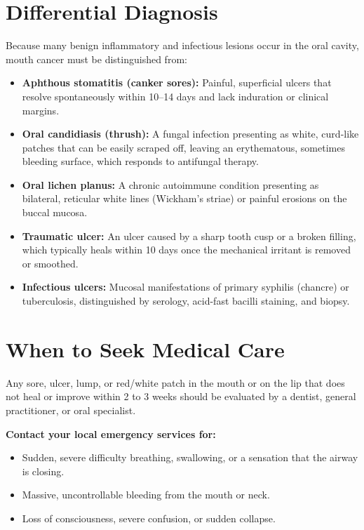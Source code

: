 \section*{Differential Diagnosis}
Because many benign inflammatory and infectious lesions occur in the oral cavity, mouth cancer must be distinguished from:
\begin{itemize}
    \item \textbf{Aphthous stomatitis (canker sores):} Painful, superficial ulcers that resolve spontaneously within 10--14 days and lack induration or clinical margins.
    \item \textbf{Oral candidiasis (thrush):} A fungal infection presenting as white, curd-like patches that can be easily scraped off, leaving an erythematous, sometimes bleeding surface, which responds to antifungal therapy.
    \item \textbf{Oral lichen planus:} A chronic autoimmune condition presenting as bilateral, reticular white lines (Wickham's striae) or painful erosions on the buccal mucosa.
    \item \textbf{Traumatic ulcer:} An ulcer caused by a sharp tooth cusp or a broken filling, which typically heals within 10 days once the mechanical irritant is removed or smoothed.
    \item \textbf{Infectious ulcers:} Mucosal manifestations of primary syphilis (chancre) or tuberculosis, distinguished by serology, acid-fast bacilli staining, and biopsy.
\end{itemize}

\section*{When to Seek Medical Care}
Any sore, ulcer, lump, or red/white patch in the mouth or on the lip that does not heal or improve within 2 to 3 weeks should be evaluated by a dentist, general practitioner, or oral specialist.

\textbf{Contact your local emergency services for:}
\begin{itemize}
    \item Sudden, severe difficulty breathing, swallowing, or a sensation that the airway is closing.
    \item Massive, uncontrollable bleeding from the mouth or neck.
    \item Loss of consciousness, severe confusion, or sudden collapse.
\end{itemize}

